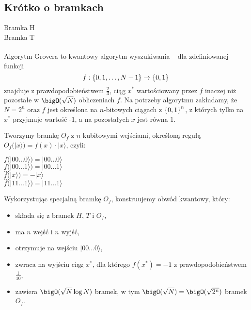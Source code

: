\subsection{Krótko o bramkach}
Bramka H \\
Bramka T \\\\

Algorytm Grovera to kwantowy algorytm wyszukiwania -- dla zdefiniowanej funkcji
\[
    f : \set{0, 1, \ldots, N - 1} \rightarrow \set{0, 1}
\]
znajduje z prawdopodobieństwem \( \frac{2}{3} \), ciąg \( x^{*} \) wartościowany przez \( f \) inaczej niż pozostałe w \( \bigO(\sqrt{N}) \) obliczeniach \( f \).
Na potrzeby algorytmu zakładamy, że \( N = 2^n \) oraz \( f \) jest określona na \( n \)-bitowych ciągach z \( \set{0, 1}^n \), z których tylko na \( x^{*} \) przyjmuje wartość -1, a na pozostałych \( x \) jest równa 1.

Tworzymy bramkę \( O_f \) z \( n \) kubitowymi wejściami, określoną regułą \( O_f (|x\rangle) = f(x) \cdot |x \rangle \), czyli:
\begin{center}
    \( f (|00\ldots0 \rangle) = |00\ldots0 \rangle \) \\
    \( f (|00\ldots1 \rangle) = |00\ldots1 \rangle \) \\
    \( \ldots \) \\
    \( f (|x \rangle) = -|x \rangle \) \\
    \( \ldots \) \\
    \( f (|11\ldots1 \rangle) = |11\ldots1 \rangle \)
\end{center}

Wykorzystując specjalną bramkę \( O_f \), konstruujemy obwód kwantowy, który:
\begin{itemize}
    \item składa się z bramek \( H \), \( T \) i \( O_f \),
    \item ma \( n \) wejść i \( n \) wyjść,
    \item otrzymuje na wejściu \( |00\ldots0 \rangle \),
    \item zwraca na wyjściu ciąg \( x^{*} \), dla którego \( f(x^{*}) = -1 \) z prawdopodobieństwem \( \frac{1}{10} \),
    \item zawiera \( \bigO(\sqrt{N} \log N) \) bramek, w tym \( \bigO(\sqrt{N}) = \bigO(\sqrt{2^n}) \) bramek \( O_f \).
\end{itemize}

